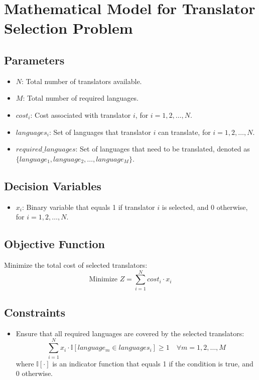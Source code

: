 \documentclass{article}
\begin{document}
\section*{Mathematical Model for Translator Selection Problem}

\subsection*{Parameters}
\begin{itemize}
    \item $N$: Total number of translators available.
    \item $M$: Total number of required languages.
    \item $cost_i$: Cost associated with translator $i$, for $i = 1, 2, \ldots, N$.
    \item $languages_i$: Set of languages that translator $i$ can translate, for $i = 1, 2, \ldots, N$.
    \item $required\_languages$: Set of languages that need to be translated, denoted as $\{language_1, language_2, \ldots, language_M\}$.
\end{itemize}

\subsection*{Decision Variables}
\begin{itemize}
    \item $x_i$: Binary variable that equals 1 if translator $i$ is selected, and 0 otherwise, for $i = 1, 2, \ldots, N$.
\end{itemize}

\subsection*{Objective Function}
Minimize the total cost of selected translators:
\[
\text{Minimize } Z = \sum_{i=1}^{N} cost_i \cdot x_i
\]

\subsection*{Constraints}
\begin{itemize}
    \item Ensure that all required languages are covered by the selected translators:
    \[
    \sum_{i=1}^{N} x_i \cdot \mathbb{I}[language_m \in languages_i] \geq 1 \quad \forall m = 1, 2, \ldots, M
    \]
    where $\mathbb{I}[\cdot]$ is an indicator function that equals 1 if the condition is true, and 0 otherwise.
\end{itemize}
\end{document}
